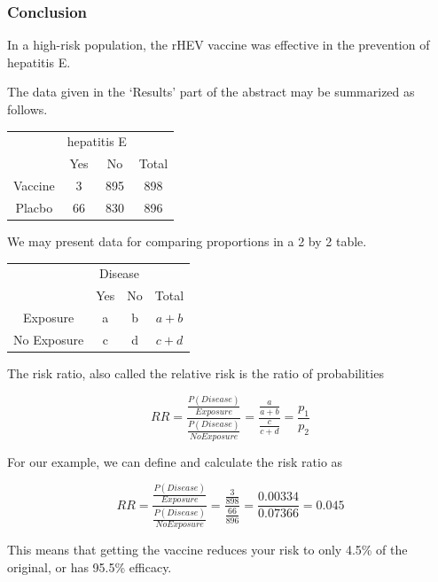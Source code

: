 \documentclass[11pt, chapterprefix=true]{scrbook}\usepackage[]{graphicx}\usepackage[]{color}
\begin{document}
\subsubsection{Conclusion}

In a high-risk population, the rHEV vaccine was effective in the prevention of
hepatitis E.

The data given in the `Results' part of the abstract may be summarized as follows.

\begin{table}[ht]
\centering
\begin{tabular}{@{} cccc @{}} \hline
 & \multicolumn{2}{c}{hepatitis E} \\
 & Yes & No & Total \\ \hline
 Vaccine & 3 & 895 & 898 \\
 Placbo  & 66 & 830 & 896 \\ \hline
 \end{tabular}
 \end{table}

We may present data for comparing proportions in a 2 by 2 table.

\begin{table}[ht]
\centering
\begin{tabular}{@{} cccc @{}} \hline
 & \multicolumn{2}{c}{Disease} \\
 & Yes & No & Total \\ \hline
 Exposure & a & b & $a + b$ \\
 No Exposure  & c & d & $c + d$ \\ \hline
 \end{tabular}
 \end{table}

The risk ratio, also called the relative risk is the ratio of probabilities

\begin{equation*}
  RR = \frac{ \frac{P(Disease)}{Exposure}}{ \frac{P(Disease)}{No Exposure} } = \frac{ \frac{a}{a + b}}{ \frac{c}{c + d} } = \frac{p_1}{p_2}
\end{equation*}

For our example, we can define and calculate the risk ratio as

\begin{equation*}
  RR = \frac{ \frac{P(Disease)}{Exposure}}{ \frac{P(Disease)}{No Exposure} } = \frac{ \frac{3}{898}}{ \frac{66}{896} } = \frac{0.00334}{0.07366} = 0.045
\end{equation*}

This means that getting the vaccine reduces your risk to only 4.5\% of the original, or has 95.5\% efficacy.
\end{document}
